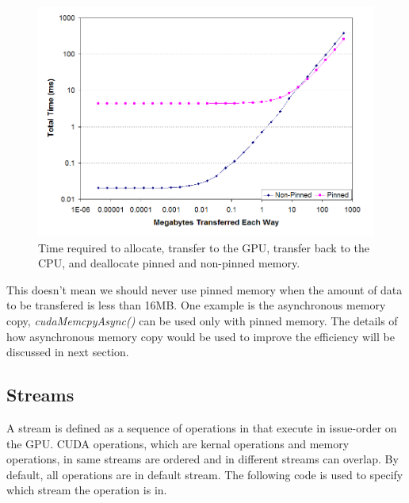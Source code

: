 \documentclass[journal,12pt,onecolumn,draftclsnofoot]{ieeeconf}  %
\begin{document}
\begin{figure}[h]
 	\centering\includegraphics[width=120mm]{pinned_trade_off.png}
 	\caption{Time required to allocate, transfer to the GPU, transfer back to the CPU, and deallocate pinned and non-pinned memory.\cite{Trade_off}}
 	\label{Time required to allocate, transfer to the GPU, transfer back to the CPU, and deallocate pinned and non-pinned memory.}
\end{figure}
This doesn't mean we should never use pinned memory when the amount of data to be transfered is less than 16MB. One example is the asynchronous memory copy, \textit{cudaMemcpyAsync()} can be used only with pinned memory. The details of how asynchronous memory copy would be used to improve the efficiency will be discussed in next section.

\subsection{Streams}
A stream is defined as a sequence of operations in that execute in issue-order on the GPU. CUDA operations, which are kernal operations and memory operations, in same streams are ordered and in different streams can overlap. By default, all operations are in default stream. The following code is used to specify which stream the operation is in. \par
\end{document}

